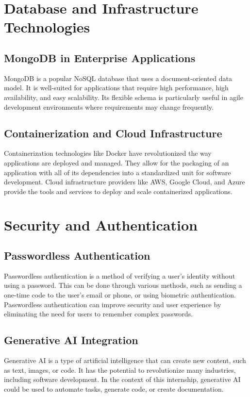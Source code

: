 \section{Database and Infrastructure Technologies}

\subsection{MongoDB in Enterprise Applications}
MongoDB is a popular NoSQL database that uses a document-oriented data model. It is well-suited for applications that require high performance, high availability, and easy scalability. Its flexible schema is particularly useful in agile development environments where requirements may change frequently.

\subsection{Containerization and Cloud Infrastructure}
Containerization technologies like Docker have revolutionized the way applications are deployed and managed. They allow for the packaging of an application with all of its dependencies into a standardized unit for software development. Cloud infrastructure providers like AWS, Google Cloud, and Azure provide the tools and services to deploy and scale containerized applications.

\section{Security and Authentication}

\subsection{Passwordless Authentication}
Passwordless authentication is a method of verifying a user's identity without using a password. This can be done through various methods, such as sending a one-time code to the user's email or phone, or using biometric authentication. Passwordless authentication can improve security and user experience by eliminating the need for users to remember complex passwords.

\subsection{Generative AI Integration}
Generative AI is a type of artificial intelligence that can create new content, such as text, images, or code. It has the potential to revolutionize many industries, including software development. In the context of this internship, generative AI could be used to automate tasks, generate code, or create documentation.

